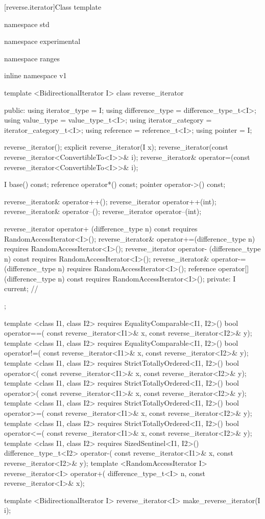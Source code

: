 [reverse.iterator]{Class template }

%
\begin{codeblock}
namespace std { namespace experimental { namespace ranges { inline namespace v1 {
  template <BidirectionalIterator I>
  class reverse_iterator {
  public:
    using iterator_type = I;
    using difference_type = difference_type_t<I>;
    using value_type = value_type_t<I>;
    using iterator_category = iterator_category_t<I>;
    using reference = reference_t<I>;
    using pointer = I;

    reverse_iterator();
    explicit reverse_iterator(I x);
    reverse_iterator(const reverse_iterator<ConvertibleTo<I>>& i);
    reverse_iterator& operator=(const reverse_iterator<ConvertibleTo<I>>& i);

    I base() const;
    reference operator*() const;
    pointer operator->() const;

    reverse_iterator& operator++();
    reverse_iterator  operator++(int);
    reverse_iterator& operator--();
    reverse_iterator  operator--(int);

    reverse_iterator  operator+ (difference_type n) const
      requires RandomAccessIterator<I>();
    reverse_iterator& operator+=(difference_type n)
      requires RandomAccessIterator<I>();
    reverse_iterator  operator- (difference_type n) const
      requires RandomAccessIterator<I>();
    reverse_iterator& operator-=(difference_type n)
      requires RandomAccessIterator<I>();
    reference operator[](difference_type n) const
      requires RandomAccessIterator<I>();
  private:
    I current; // \expos
  };

  template <class I1, class I2>
      requires EqualityComparable<I1, I2>()
    bool operator==(
      const reverse_iterator<I1>& x,
      const reverse_iterator<I2>& y);
  template <class I1, class I2>
      requires EqualityComparable<I1, I2>()
    bool operator!=(
      const reverse_iterator<I1>& x,
      const reverse_iterator<I2>& y);
  template <class I1, class I2>
      requires StrictTotallyOrdered<I1, I2>()
    bool operator<(
      const reverse_iterator<I1>& x,
      const reverse_iterator<I2>& y);
  template <class I1, class I2>
      requires StrictTotallyOrdered<I1, I2>()
    bool operator>(
      const reverse_iterator<I1>& x,
      const reverse_iterator<I2>& y);
  template <class I1, class I2>
      requires StrictTotallyOrdered<I1, I2>()
    bool operator>=(
      const reverse_iterator<I1>& x,
      const reverse_iterator<I2>& y);
  template <class I1, class I2>
      requires StrictTotallyOrdered<I1, I2>()
    bool operator<=(
      const reverse_iterator<I1>& x,
      const reverse_iterator<I2>& y);
  template <class I1, class I2>
      requires SizedSentinel<I1, I2>()
    difference_type_t<I2> operator-(
      const reverse_iterator<I1>& x,
      const reverse_iterator<I2>& y);
  template <RandomAccessIterator I>
    reverse_iterator<I>
      operator+(
    difference_type_t<I> n,
    const reverse_iterator<I>& x);

  template <BidirectionalIterator I>
    reverse_iterator<I> make_reverse_iterator(I i);
}}}}
\end{codeblock}

